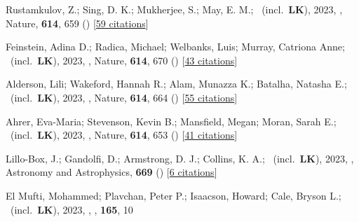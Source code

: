 \item[{\color{numcolor}\scriptsize83}] Rustamkulov, Z.; Sing, D. K.; Mukherjee, S.; May, E. M.; \etal\ (incl.\ \textbf{LK}), 2023, , Nature, \textbf{614}, 659 () [\href{https://ui.adsabs.harvard.edu/abs/2023Natur.614..659R}{59 citations}]

\item[{\color{numcolor}\scriptsize82}] Feinstein, Adina D.; Radica, Michael; Welbanks, Luis; Murray, Catriona Anne; \etal\ (incl.\ \textbf{LK}), 2023, , Nature, \textbf{614}, 670 () [\href{https://ui.adsabs.harvard.edu/abs/2023Natur.614..670F}{43 citations}]

\item[{\color{numcolor}\scriptsize81}] Alderson, Lili; Wakeford, Hannah R.; Alam, Munazza K.; Batalha, Natasha E.; \etal\ (incl.\ \textbf{LK}), 2023, , Nature, \textbf{614}, 664 () [\href{https://ui.adsabs.harvard.edu/abs/2023Natur.614..664A}{55 citations}]

\item[{\color{numcolor}\scriptsize80}] Ahrer, Eva-Maria; Stevenson, Kevin B.; Mansfield, Megan; Moran, Sarah E.; \etal\ (incl.\ \textbf{LK}), 2023, , Nature, \textbf{614}, 653 () [\href{https://ui.adsabs.harvard.edu/abs/2023Natur.614..653A}{41 citations}]

\item[{\color{numcolor}\scriptsize79}] Lillo-Box, J.; Gandolfi, D.; Armstrong, D. J.; Collins, K. A.; \etal\ (incl.\ \textbf{LK}), 2023, , Astronomy and Astrophysics, \textbf{669} () [\href{https://ui.adsabs.harvard.edu/abs/2023A&A...669A.109L}{6 citations}]

\item[{\color{numcolor}\scriptsize78}] El Mufti, Mohammed; Plavchan, Peter P.; Isaacson, Howard; Cale, Bryson L.; \etal\ (incl.\ \textbf{LK}), 2023, , \aj, \textbf{165}, 10

